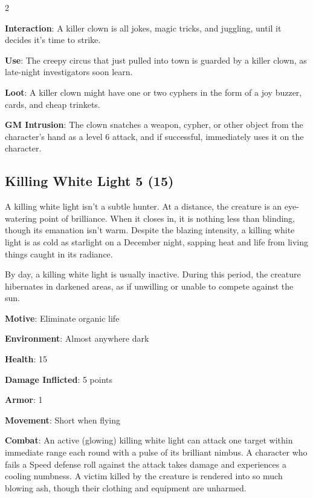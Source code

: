 \begin{multicols}{2}

\textbf{Interaction}: A killer clown is all jokes, magic tricks, and juggling, until it decides it’s time to strike.

\textbf{Use}: The creepy circus that just pulled into town is guarded by a killer clown, as late-night investigators soon learn.

\textbf{Loot}: A killer clown might have one or two cyphers in the form of a joy buzzer, cards, and cheap trinkets.

\textbf{GM Intrusion}: The clown snatches a weapon, cypher, or other object from the character’s hand as a level 6 attack, and if successful, immediately uses it on the character.

\subsection{Killing White Light 5 (15)}

A killing white light isn’t a subtle hunter. At a distance, the creature is an eye-watering point of brilliance. When it closes in, it is nothing less than blinding, though its emanation isn’t warm. Despite the blazing intensity, a killing white light is as cold as starlight on a December night, sapping heat and life from living things caught in its radiance.

By day, a killing white light is usually inactive. During this period, the creature hibernates in darkened areas, as if unwilling or unable to compete against the sun. 

\textbf{Motive}: Eliminate organic life

\textbf{Environment}: Almost anywhere dark

\textbf{Health}: 15

\textbf{Damage Inflicted}: 5 points

\textbf{Armor}: 1

\textbf{Movement}: Short when flying

\textbf{Combat}: An active (glowing) killing white light can attack one target within immediate range each round with a pulse of its brilliant nimbus. A character who fails a Speed defense roll against the attack takes damage and experiences a cooling numbness. A victim killed by the creature is rendered into so much blowing ash, though their clothing and equipment are unharmed.


\end{multicols}
